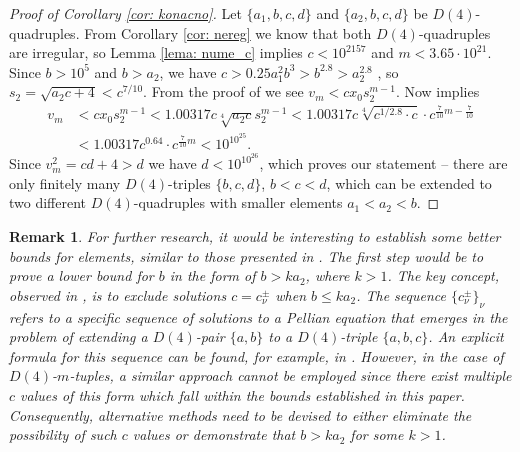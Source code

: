 \documentclass[12pt]{amsart}%
\theoremstyle{definition}
\theoremstyle{remark}
\theoremstyle{plain}
\newtheorem*{rem}{Remark}
\begin{document}
\begin{proof}[Proof of Corollary \ref{cor: konacno}]
Let $\{a_1,b,c,d\}$ and $\{a_2,b,c,d\}$ be $D(4)$-quad\-ru\-ples. From Corollary \ref{cor: nereg} we know that both $D(4)$-quadruples are irregular, so Lemma \ref{lema: nume_c} implies $c<10^{2157}$ and $m<3.65\cdot 10^{21}.$
Since $b>10^5$ and $b>a_2$, we have $c>0.25a_1^2b^3>b^{2.8}>a_2^{2.8}$ , so $s_2=\sqrt{a_2c+4}<c^{7/10}$. From the proof of \cite[Lemma 5]{fil_xy4} we see $v_m<cx_0s_2^{m-1}$. Now  \cite[Lemma 2.5]{mbt} implies 
 \begin{align*}
 v_m&<cx_0s_2^{m-1}<1.00317c\sqrt[4]{a_2c}s_2^{m-1}<1.00317c\sqrt[4]{c^{1/2.8}\cdot c}\cdot c^{\frac{7}{10}m-\frac{7}{10}}\\
 &<1.00317c^{0.64}\cdot c^{\frac{7}{10}m}
 <10^{10^{25}}.
 \end{align*}
 Since $v_m^2=cd+4>d$ we have $d<10^{10^{26}}$, which proves our statement -- there are only finitely many $D(4)$-triples $\{b,c,d\}$, $b<c<d$, which can be extended to two different $D(4)$-quadruples with smaller elements $a_1<a_2<b$.
\end{proof}


\begin{rem}
For further research, it would be interesting to  establish some better bounds for elements,  similar to those presented in \cite{cdf2}. The first step would be to prove a lower bound for $b$ in the form of $b > ka_2$, where $k > 1$. The key concept, observed in \cite{cdf2}, is to exclude solutions $c=c_{\nu}^{\pm }$ when $b\leq ka_2$. The sequence $\{c_{\nu}^{\pm }\}_{\nu}$ refers to a specific sequence of solutions to a Pellian equation that emerges in the problem of extending a $D(4)$-pair $\{a,b\}$ to a $D(4)$-triple $\{a,b,c\}$. An explicit formula for this sequence can be found, for example, in \cite{mbt}. However, in the case of $D(4)$-$m$-tuples, a similar approach cannot be employed since there exist multiple $c$ values of this form which fall within the bounds established in this paper. Consequently, alternative methods need to be devised to either eliminate the possibility of such $c$ values or demonstrate that $b > ka_2$ for some $k > 1$.
\end{rem}
\end{document}
